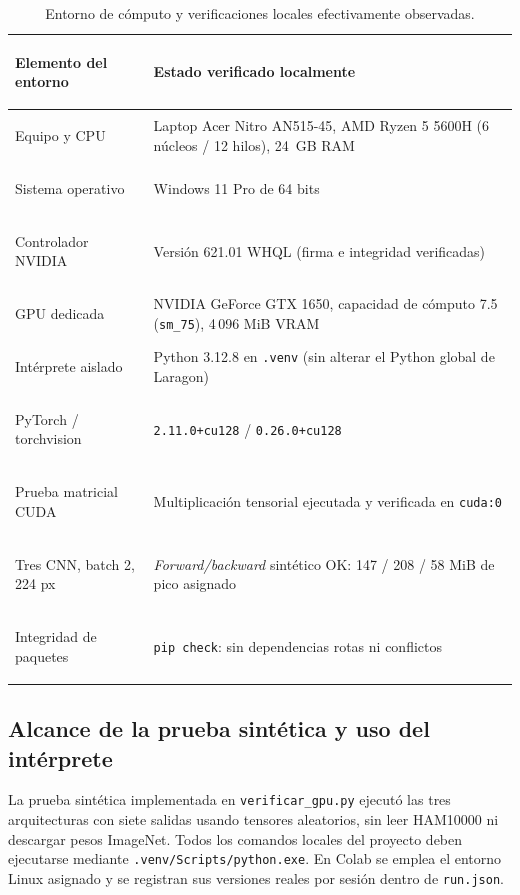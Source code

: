\begin{table}[htbp]\centering\small
\caption{Entorno de cómputo y verificaciones locales efectivamente observadas.}
\begin{tabularx}{\textwidth}{@{}>{\bfseries\raggedright\arraybackslash}p{4.8cm}>{\raggedright\arraybackslash}X@{}}
\toprule
\textbf{Elemento del entorno} & \textbf{Estado verificado localmente} \\ \midrule
Equipo y CPU & Laptop Acer Nitro AN515-45, AMD Ryzen 5 5600H (6 núcleos / 12 hilos), 24~GB RAM \\
Sistema operativo & Windows 11 Pro de 64 bits \\
Controlador NVIDIA & Versión 621.01 WHQL (firma e integridad verificadas) \\
GPU dedicada & NVIDIA GeForce GTX 1650, capacidad de cómputo 7.5 (\texttt{sm\_75}), 4\,096 MiB VRAM \\
Intérprete aislado & Python 3.12.8 en \texttt{.venv} (sin alterar el Python global de Laragon) \\
PyTorch / torchvision & \texttt{2.11.0+cu128} / \texttt{0.26.0+cu128} \\
Prueba matricial CUDA & Multiplicación tensorial ejecutada y verificada en \texttt{cuda:0} \\
Tres CNN, batch 2, 224 px & \textit{Forward/backward} sintético OK: 147 / 208 / 58 MiB de pico asignado \\
Integridad de paquetes & \texttt{pip check}: sin dependencias rotas ni conflictos \\
\bottomrule
\end{tabularx}
\end{table}

\subsection{Alcance de la prueba sintética y uso del intérprete}
La prueba sintética implementada en \texttt{verificar\_gpu.py} ejecutó las tres arquitecturas con siete salidas usando tensores aleatorios, sin leer HAM10000 ni descargar pesos ImageNet. Todos los comandos locales del proyecto deben ejecutarse mediante \texttt{.venv/Scripts/python.exe}. En Colab se emplea el entorno Linux asignado y se registran sus versiones reales por sesión dentro de \texttt{run.json}.
